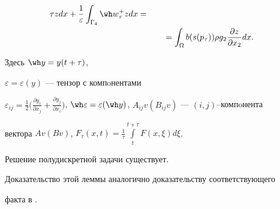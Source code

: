 \begin{defn}
\begin{align}
{\tau} z dx +


\frac{1}{\varepsilon} \int_{\Gamma_{4}}


\wh w_{\tau}^{+} z dx = \notag \\


%


&\qquad = \int _{\Omega} b(s(p_{\tau})) \rho 


g_{2} \frac{\partial z}{\partial x_{2}} dx.


\label{eq16}


\end{align}


Здесь $\wh y=y(t+\tau)$,


$\varepsilon = \varepsilon(y)$ --- тензор с компoнентами


$\varepsilon_{ij}= \frac{1}{2} \big(


\frac{\partial y_{i}}{\partial x_{j}}


+ \frac{\partial y_{j}}{\partial x_{i}}\big)$, $\wh \varepsilon =


\varepsilon(\wh y)$, $A_{ij}v (B_{ij}v)$ --- $(i,j)$--компoнента


вектора $Av(Bv)$, $F_{\tau}(x,t)=


\frac{1}{\tau} \int\limits_{t}^{t+ \tau} F(x, \xi) d \xi$.


\end{defn}





\begin{lem}


Решение полудискретной задачи существует.


\label{l1}


\end{lem}





Доказательство этой леммы аналогично доказательству соответствующего


факта в \cite{3}.





